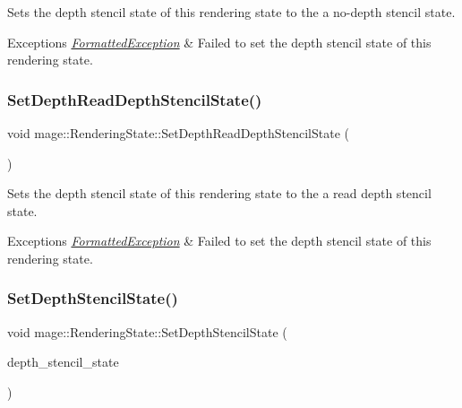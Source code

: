 Sets the depth stencil state of this rendering state to the a no-\/depth stencil state.


\begin{DoxyExceptions}{Exceptions}
{\em \hyperlink{structmage_1_1_formatted_exception}{Formatted\+Exception}} & Failed to set the depth stencil state of this rendering state. \\
\hline
\end{DoxyExceptions}
\hypertarget{structmage_1_1_rendering_state_a86ff2bb5739ada7ffcc275f4624d2a24}{}\label{structmage_1_1_rendering_state_a86ff2bb5739ada7ffcc275f4624d2a24} 
\subsubsection{\texorpdfstring{Set\+Depth\+Read\+Depth\+Stencil\+State()}{SetDepthReadDepthStencilState()}}
{\footnotesize\ttfamily void mage\+::\+Rendering\+State\+::\+Set\+Depth\+Read\+Depth\+Stencil\+State (\begin{DoxyParamCaption}{ }\end{DoxyParamCaption})}

Sets the depth stencil state of this rendering state to the a read depth stencil state.


\begin{DoxyExceptions}{Exceptions}
{\em \hyperlink{structmage_1_1_formatted_exception}{Formatted\+Exception}} & Failed to set the depth stencil state of this rendering state. \\
\hline
\end{DoxyExceptions}
\hypertarget{structmage_1_1_rendering_state_ad6081a1d840e30f58a8090f80e59b8fe}{}\label{structmage_1_1_rendering_state_ad6081a1d840e30f58a8090f80e59b8fe} 
\subsubsection{\texorpdfstring{Set\+Depth\+Stencil\+State()}{SetDepthStencilState()}}
{\footnotesize\ttfamily void mage\+::\+Rendering\+State\+::\+Set\+Depth\+Stencil\+State (\begin{DoxyParamCaption}\item[{I\+D3\+D11\+Depth\+Stencil\+State $\ast$}]{depth\+\_\+stencil\+\_\+state }\end{DoxyParamCaption})\hspace{0.3cm}{\ttfamily [noexcept]}}

